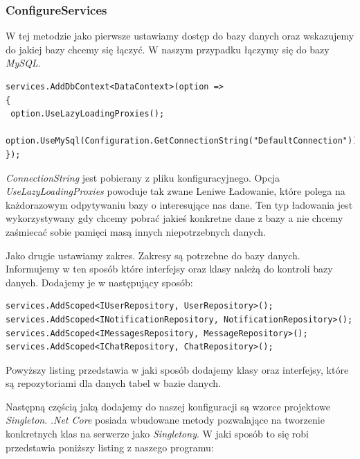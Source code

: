 \documentclass[12pt,a4paper]{article}
\begin{document}
\subsubsection{ConfigureServices}

\hspace*{0.7cm} W tej metodzie jako pierwsze ustawiamy dostęp do bazy danych oraz wskazujemy do jakiej bazy chcemy się łączyć. W naszym przypadku łączymy się do bazy \textit{MySQL}.

\begin{lstlisting}[caption={Dodanie bazy danych do konfiguracji}]
services.AddDbContext<DataContext>(option => 
{
 option.UseLazyLoadingProxies();
 option.UseMySql(Configuration.GetConnectionString("DefaultConnection"));
});
\end{lstlisting}

\hspace*{0.7cm} \textit{ConnectionString} jest pobierany z pliku konfiguracyjnego. Opcja \textit{UseLazyLoadingProxies} powoduje tak zwane Leniwe Ładowanie, które polega na każdorazowym odpytywaniu bazy o interesujące nas dane. Ten typ ładowania jest wykorzystywany gdy chcemy pobrać jakieś konkretne dane z bazy a nie chcemy zaśmiecać sobie pamięci masą innych niepotrzebnych danych.\newline

\hspace*{0.7cm} Jako drugie ustawiamy zakres. Zakresy są potrzebne do bazy danych. Informujemy w ten sposób które interfejsy oraz klasy należą do kontroli bazy danych. Dodajemy je w następujący sposób:

\begin{lstlisting}[caption={Dodanie klas Repository}]
services.AddScoped<IUserRepository, UserRepository>();
services.AddScoped<INotificationRepository, NotificationRepository>();
services.AddScoped<IMessagesRepository, MessageRepository>();
services.AddScoped<IChatRepository, ChatRepository>();
\end{lstlisting}

\hspace*{0.7cm} Powyższy listing przedstawia w jaki sposób dodajemy klasy oraz interfejsy, które są repozytoriami dla danych tabel w bazie danych.\newline

\hspace*{0.7cm} Następną częścią jaką dodajemy do naszej konfiguracji są wzorce projektowe \textit{Singleton}. \textit{.Net Core} posiada wbudowane metody pozwalające na tworzenie konkretnych klas na serwerze jako \textit{Singletony}. W jaki sposób to się robi przedstawia poniższy listing z naszego programu:
\end{document}
